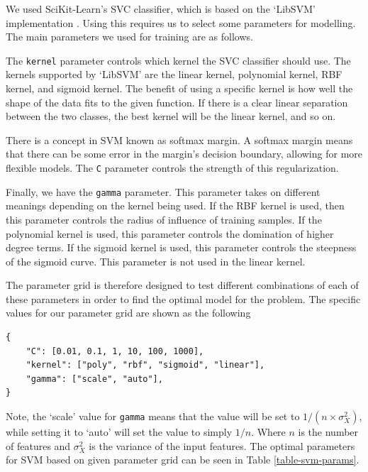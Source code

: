

We used SciKit-Learn's SVC classifier, which is based on the `LibSVM' implementation \cite{scikit-learn,chang2011libsvm}. Using this requires us to select some parameters for modelling. The main parameters we used for training are as follows.

The \lstinline{kernel} parameter controls which kernel the SVC classifier should use. The kernels supported by `LibSVM' are the linear kernel, polynomial kernel, RBF kernel, and sigmoid kernel. The benefit of using a specific kernel is how well the shape of the data fits to the given function. If there is a clear linear separation between the two classes, the best kernel will be the linear kernel, and so on.

There is a concept in SVM known as softmax margin. A softmax margin means that there can be some error in the margin's decision boundary, allowing for more flexible models. The \lstinline{C} parameter controls the strength of this regularization.

Finally, we have the \lstinline{gamma} parameter. This parameter takes on different meanings depending on the kernel being used. If the RBF kernel is used, then this parameter controls the radius of influence of training samples. If the polynomial kernel is used, this parameter controls the domination of higher degree terms. If the sigmoid kernel is used, this parameter controls the steepness of the sigmoid curve. This parameter is not used in the linear kernel. \cite{scikit-learn}

The parameter grid is therefore designed to test different combinations of each of these parameters in order to find the optimal model for the problem. The specific values for our parameter grid are shown as the following 
\begin{lstlisting}
{
    "C": [0.01, 0.1, 1, 10, 100, 1000],
    "kernel": ["poly", "rbf", "sigmoid", "linear"],
    "gamma": ["scale", "auto"],
}
\end{lstlisting}
Note, the `scale' value for \lstinline{gamma} means that the value will be set to $1/(n \times \sigma^{2}_{X})$, while setting it to `auto' will set the value to simply $1/n$. Where $n$ is the number of features and $\sigma^{2}_{X}$ is the variance of the input features. The optimal parameters for SVM based on given parameter grid can be seen in Table \ref{table-svm-params}.



